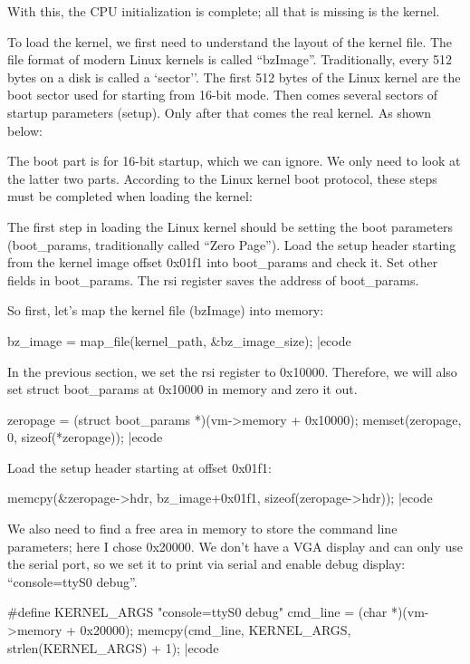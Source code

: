 With this, the CPU initialization is complete; all that is missing is the kernel.


To load the kernel, we first need to understand the layout of the kernel file. The file format of modern Linux kernels is called ``bzImage''. Traditionally, every  512 bytes on a disk is called a `sector''. The first  512 bytes of the Linux kernel are the boot sector used for starting from  16-bit mode. Then comes several sectors of startup parameters (setup). Only after that comes the real kernel. As shown below:


The boot part is for  16-bit startup, which we can ignore. We only need to look at the latter two parts. According to the Linux kernel boot protocol, these steps must be completed when loading the kernel:

\bli
\li The first step in loading the  Linux kernel should be setting the boot parameters ({\itt boot\_params}, traditionally called ``Zero Page'').
\li Load the  setup header starting from the kernel image offset  0x01f1 into  {\itt boot\_params} and check it.
\li Set other fields in  {\itt boot\_params}.
\li The {\itt rsi} register saves the address of  {\itt boot\_params}.
\eli

So first, let's map the kernel file (bzImage) into memory:

\bcode
bz_image = map_file(kernel_path, &bz_image_size);
|ecode

In the previous section, we set the  {\itt rsi} register to  0x10000. Therefore, we will also set  {\itt struct boot\_params} at  0x10000 in memory and zero it out.

\bcode
zeropage = (struct boot_params *)(vm->memory + 0x10000);
memset(zeropage, 0, sizeof(*zeropage));
|ecode

Load the  setup header starting at offset  0x01f1:

\bcode
memcpy(&zeropage->hdr, bz_image+0x01f1, sizeof(zeropage->hdr));
|ecode

We also need to find a free area in memory to store the command line parameters; here I chose  0x20000. We don't have a VGA display and can only use the serial port, so we set it to print via serial and enable debug display: ``console=ttyS0 debug''.

\bcode
#define KERNEL_ARGS "console=ttyS0 debug"
cmd_line = (char *)(vm->memory + 0x20000);
memcpy(cmd_line, KERNEL_ARGS, strlen(KERNEL_ARGS) + 1);
|ecode

